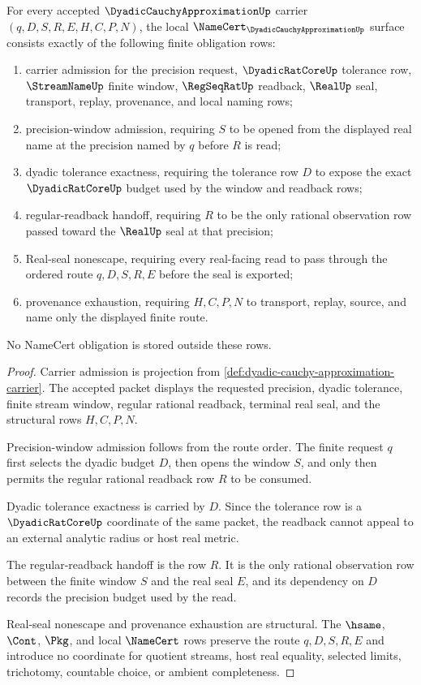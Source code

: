 \begin{theorem}
\label{thm:dyadic-cauchy-approximation-namecert-obligations}
For every accepted $\DyadicCauchyApproximationUp$ carrier $(q,D,S,R,E,H,C,P,N)$, the local $\NameCert_{\DyadicCauchyApproximationUp}$ surface consists exactly of the following finite obligation rows:
\begin{enumerate}
\item carrier admission for the precision request, $\DyadicRatCoreUp$ tolerance row, $\StreamNameUp$ finite window, $\RegSeqRatUp$ readback, $\RealUp$ seal, transport, replay, provenance, and local naming rows;
\item precision-window admission, requiring $S$ to be opened from the displayed real name at the precision named by $q$ before $R$ is read;
\item dyadic tolerance exactness, requiring the tolerance row $D$ to expose the exact $\DyadicRatCoreUp$ budget used by the window and readback rows;
\item regular-readback handoff, requiring $R$ to be the only rational observation row passed toward the $\RealUp$ seal at that precision;
\item Real-seal nonescape, requiring every real-facing read to pass through the ordered route $q,D,S,R,E$ before the seal is exported;
\item provenance exhaustion, requiring $H,C,P,N$ to transport, replay, source, and name only the displayed finite route.
\end{enumerate}
No NameCert obligation is stored outside these rows.
\end{theorem}
\begin{proof}
Carrier admission is projection from \autoref{def:dyadic-cauchy-approximation-carrier}. The accepted packet displays the requested precision, dyadic tolerance, finite stream window, regular rational readback, terminal real seal, and the structural rows $H,C,P,N$.

Precision-window admission follows from the route order. The finite request $q$ first selects the dyadic budget $D$, then opens the window $S$, and only then permits the regular rational readback row $R$ to be consumed.

Dyadic tolerance exactness is carried by $D$. Since the tolerance row is a $\DyadicRatCoreUp$ coordinate of the same packet, the readback cannot appeal to an external analytic radius or host real metric.

The regular-readback handoff is the row $R$. It is the only rational observation row between the finite window $S$ and the real seal $E$, and its dependency on $D$ records the precision budget used by the read.

Real-seal nonescape and provenance exhaustion are structural. The $\hsame$, $\Cont$, $\Pkg$, and local $\NameCert$ rows preserve the route $q,D,S,R,E$ and introduce no coordinate for quotient streams, host real equality, selected limits, trichotomy, countable choice, or ambient completeness.
\end{proof}

